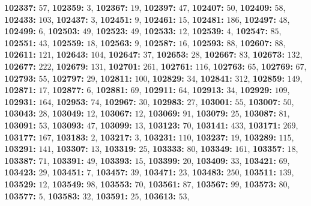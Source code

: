 \textsf{\bfseries 102337:} $57$, \textsf{\bfseries 102359:} $3$, \textsf{\bfseries 102367:} $19$, \textsf{\bfseries 102397:} $47$, \textsf{\bfseries 102407:} $50$, \textsf{\bfseries 102409:} $58$, \textsf{\bfseries 102433:} $103$, \textsf{\bfseries 102437:} $3$, \textsf{\bfseries 102451:} $9$, \textsf{\bfseries 102461:} $15$, \textsf{\bfseries 102481:} $186$, \textsf{\bfseries 102497:} $48$, \textsf{\bfseries 102499:} $6$, \textsf{\bfseries 102503:} $49$, \textsf{\bfseries 102523:} $49$, \textsf{\bfseries 102533:} $12$, \textsf{\bfseries 102539:} $4$, \textsf{\bfseries 102547:} $85$, \textsf{\bfseries 102551:} $43$, \textsf{\bfseries 102559:} $18$, \textsf{\bfseries 102563:} $9$, \textsf{\bfseries 102587:} $16$, \textsf{\bfseries 102593:} $88$, \textsf{\bfseries 102607:} $88$, \textsf{\bfseries 102611:} $121$, \textsf{\bfseries 102643:} $104$, \textsf{\bfseries 102647:} $37$, \textsf{\bfseries 102653:} $28$, \textsf{\bfseries 102667:} $83$, \textsf{\bfseries 102673:} $132$, \textsf{\bfseries 102677:} $222$, \textsf{\bfseries 102679:} $131$, \textsf{\bfseries 102701:} $261$, \textsf{\bfseries 102761:} $116$, \textsf{\bfseries 102763:} $65$, \textsf{\bfseries 102769:} $67$, \textsf{\bfseries 102793:} $55$, \textsf{\bfseries 102797:} $29$, \textsf{\bfseries 102811:} $100$, \textsf{\bfseries 102829:} $34$, \textsf{\bfseries 102841:} $312$, \textsf{\bfseries 102859:} $149$, \textsf{\bfseries 102871:} $17$, \textsf{\bfseries 102877:} $6$, \textsf{\bfseries 102881:} $69$, \textsf{\bfseries 102911:} $64$, \textsf{\bfseries 102913:} $34$, \textsf{\bfseries 102929:} $109$, \textsf{\bfseries 102931:} $164$, \textsf{\bfseries 102953:} $74$, \textsf{\bfseries 102967:} $30$, \textsf{\bfseries 102983:} $27$, \textsf{\bfseries 103001:} $55$, \textsf{\bfseries 103007:} $50$, \textsf{\bfseries 103043:} $28$, \textsf{\bfseries 103049:} $12$, \textsf{\bfseries 103067:} $12$, \textsf{\bfseries 103069:} $91$, \textsf{\bfseries 103079:} $25$, \textsf{\bfseries 103087:} $81$, \textsf{\bfseries 103091:} $53$, \textsf{\bfseries 103093:} $47$, \textsf{\bfseries 103099:} $13$, \textsf{\bfseries 103123:} $70$, \textsf{\bfseries 103141:} $433$, \textsf{\bfseries 103171:} $269$, \textsf{\bfseries 103177:} $167$, \textsf{\bfseries 103183:} $2$, \textsf{\bfseries 103217:} $3$, \textsf{\bfseries 103231:} $110$, \textsf{\bfseries 103237:} $19$, \textsf{\bfseries 103289:} $115$, \textsf{\bfseries 103291:} $141$, \textsf{\bfseries 103307:} $13$, \textsf{\bfseries 103319:} $25$, \textsf{\bfseries 103333:} $80$, \textsf{\bfseries 103349:} $161$, \textsf{\bfseries 103357:} $18$, \textsf{\bfseries 103387:} $71$, \textsf{\bfseries 103391:} $49$, \textsf{\bfseries 103393:} $15$, \textsf{\bfseries 103399:} $20$, \textsf{\bfseries 103409:} $33$, \textsf{\bfseries 103421:} $69$, \textsf{\bfseries 103423:} $29$, \textsf{\bfseries 103451:} $7$, \textsf{\bfseries 103457:} $39$, \textsf{\bfseries 103471:} $23$, \textsf{\bfseries 103483:} $250$, \textsf{\bfseries 103511:} $139$, \textsf{\bfseries 103529:} $12$, \textsf{\bfseries 103549:} $98$, \textsf{\bfseries 103553:} $70$, \textsf{\bfseries 103561:} $87$, \textsf{\bfseries 103567:} $99$, \textsf{\bfseries 103573:} $80$, \textsf{\bfseries 103577:} $5$, \textsf{\bfseries 103583:} $32$, \textsf{\bfseries 103591:} $25$, \textsf{\bfseries 103613:} $53$, 
